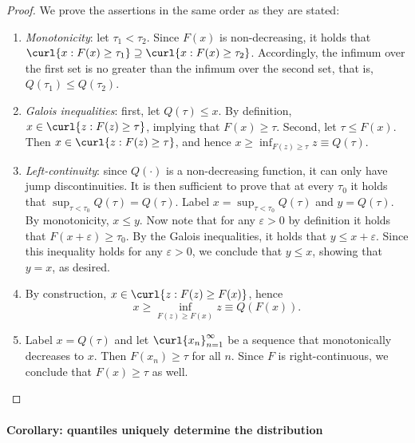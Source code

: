 \begin{proof}
 	
 	We prove the assertions in the same order as they are stated: 
 \begin{enumerate}
 	\item \emph{Monotonicity}: let $\tau_1<\tau_2$. Since $F(x)$ is non-decreasing, it holds that $\curl{x: F(x)\geq \tau_1} \supseteq \curl{x: F(x)\geq \tau_2}$. Accordingly, the infimum over the first set is no greater than the infimum over the second set, that is, $Q(\tau_1)\leq Q(\tau_2)$.
 		\item \emph{Galois inequalities}: first, 	let $Q(\tau)\leq x$. By definition, $x\in \curl{z: F(z)\geq \tau}$, implying that $F(x)\geq \tau$. 
 		Second, let $\tau\leq F(x)$. Then $x\in\curl{z: F(z)\geq \tau}$, and hence $x\geq \inf_{F(z)\geq \tau} z\equiv Q(\tau)$.
  
\item  \emph{Left-continuity}: since $Q(\cdot)$ is a non-decreasing function, it can only have jump discontinuities. It is then sufficient to prove that at every $\tau_0$ it holds that $\sup_{\tau<\tau_0} Q(\tau) = Q(\tau)$. Label $x=\sup_{\tau<\tau_0} Q(\tau)$ and $y=Q(\tau)$.
 By monotonicity, $x\leq y$. Now note that for any $\varepsilon>0$ by definition it holds that $F(x+\varepsilon)\geq \tau_0$. By the Galois inequalities, it holds that $y\leq x+\varepsilon$. Since this inequality holds for any $\varepsilon>0$, we conclude that $y\leq x$, showing that $y=x$, as desired. 
  
  	 \item By construction, $x \in \curl{z: F(z)\geq F(x)}$, hence 
  	 \begin{equation}
  	 	x \geq \inf_{F(z)\geq F(x)} z \equiv Q(F(x)).
  	 \end{equation}
 
 \item Label $x= Q(\tau)$ and  let  $\curl{x_n}_{n=1}^{\infty}$ be a sequence that monotonically decreases to $x$. Then $F(x_n)\geq \tau$ for all $n$. Since $F$ is right-continuous, we conclude that $F(x)\geq \tau$ as well.
 \end{enumerate}
 \end{proof}

 
 
 \paragraph{Corollary: quantiles uniquely determine the distribution}
 
